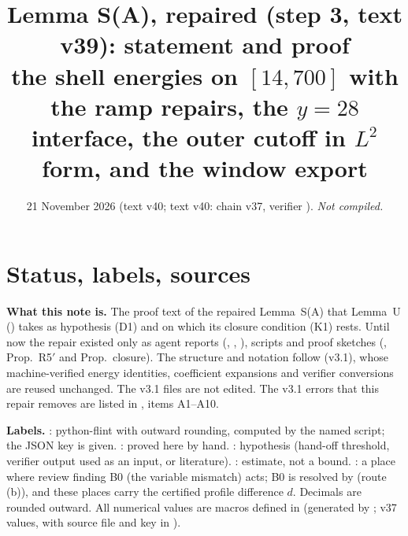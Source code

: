 \documentclass[11pt]{article}
\title{Lemma S(A), repaired (step 3, text v39): statement and proof\\[2pt]\large the shell energies on $[14,700]$ with the ramp repairs, the $y=28$ interface, the outer cutoff in $L^2$ form, and the window export}
\author{}\date{21 November 2026 (text v40; text v40: chain v37, verifier \fn{fin13v4c}). \emph{Not compiled.}}
\begin{document}
\maketitle
\tableofcontents
\fi

\section{Status, labels, sources}\label{A:sec:status}
\noindent\textbf{What this note is.} The proof text of the repaired Lemma~S(A) that Lemma~U () takes as hypothesis (D1) and on which its closure condition (K1) rests. Until now the repair existed only as agent reports (, , ), scripts and proof sketches (, Prop.~R5$'$ and Prop.~closure). The structure and notation follow  (v3.1), whose machine-verified energy identities, coefficient expansions and verifier conversions are reused unchanged. The v3.1 files are not edited. The v3.1 errors that this repair removes are listed in , items A1--A10.

\noindent\textbf{Labels.} \tC: python-flint  with outward rounding, computed by the named script; the JSON key is given. \tP: proved here by hand. \tH: hypothesis (hand-off threshold, verifier output used as an input, or literature). \tE: estimate, not a bound. \tB: a place where review finding B0 (the variable mismatch) acts; B0 is resolved by  (route (b)), and these places carry the certified profile difference $d$. Decimals are rounded outward. All numerical values are macros defined in  (generated by ; v37 values, with source file and key in ).
\end{document}
